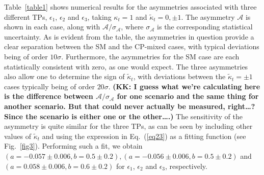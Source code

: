 \documentclass[aps,preprint,tightenlines,floatfix,superscriptaddress,nofootinbib,showpacs]{revtex4-1}
\def\kp{\kappa_t}
\def\kpt{\tilde{\kappa}_t}
\begin{document}
Table~\ref{table1} shows numerical results for the
asymmetries associated with three different TPs,
$\epsilon_1$, $\epsilon_2$ and $\epsilon_3$, taking
$\kp=1$ and $\kpt=0,\pm 1$.  The asymmetry $\mathcal{A}$
is shown in each case, along with $\mathcal{A}/\sigma_{\mathcal{A}}$, where
$\sigma_{\mathcal{A}}$ is the corresponding
statistical uncertainty.  As is
evident from the table, the asymmetries in question provide
a clear separation between the SM and the 
$\mathrm{CP}$-mixed cases, with typical deviations being of
order $10\sigma$.  Furthermore, the asymmetries
for the SM case are each statistically consistent with zero,
as one would expect.
The three asymmetries also allow one to
determine the sign of $\kpt$,
with deviations between the $\kpt = \pm 1$ cases typically
being of order $20\sigma$.
{\bf (KK: I guess what we're calculating here is the
  difference between $\mathcal{A}/\sigma_{\mathcal{A}}$ for
  one scenario and the same thing for another scenario.  But that
  could never actually be measured, right\ldots?  Since the scenario
  is either one or the other\ldots.)}
The sensitivity of
the asymmetry is quite similar for the three TPs, as can be seen by
including other values of $\kpt$ and using the expression in
Eq.~(\ref{eq23}) as a fitting function (see Fig.~\ref{fig3}).
Performing such a fit, 
we obtain $(a=-0.057\pm 0.006, b=0.5\pm 0.2),
(a=-0.056\pm 0.006, b=0.5 \pm 0.2)$ and $(a=0.058\pm 0.006, b=0.6 \pm
0.2)$ for $\epsilon_1$, $\epsilon_2$ and $\epsilon_3$,
respectively.
\end{document}
